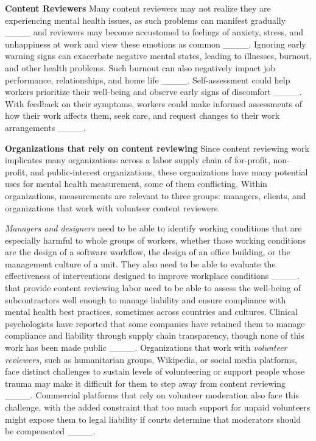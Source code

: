 \textbf{Content Reviewers}
Many content reviewers may not realize they are experiencing mental health issues, as such problems can manifest gradually ____ and reviewers may become accustomed to feelings of anxiety, stress, and unhappiness at work and view these emotions as common ____. Ignoring early warning signs can exacerbate negative mental states, leading to illnesses, burnout, and other health problems. Such burnout can also negatively impact job performance, relationships, and home life ____. Self-assessment could help workers prioritize their well-being and observe early signs of discomfort ____. With feedback on their symptoms, workers could make informed assessments of how their work affects them, seek care, and request changes to their work arrangements ____. 


\textbf{Organizations that rely on content reviewing}
Since content reviewing work implicates many organizations across a labor supply chain of for-profit, non-profit, and public-interest organizations, these organizations have many potential uses for mental health measurement, some of them conflicting. Within organizations, measurements are relevant to three groups: managers, clients, and organizations that work with volunteer content reviewers.

\textit{Managers and designers} need to be able to identify working conditions that are especially harmful to whole groups of workers, whether those working conditions are the design of a software workflow, the design of an office building, or the management culture of a unit. They also need to be able to evaluate the effectiveness of interventions designed to improve workplace conditions ____.  that provide content reviewing labor need to be able to assess the well-being of subcontractors well enough to manage liability and ensure compliance with mental health best practices, sometimes across countries and cultures. Clinical psychologists have reported that some companies have retained them to manage compliance and liability through supply chain transparency, though none of this work has been made public ____. Organizations that work with \textit{volunteer reviewers,} such as humanitarian groups, Wikipedia, or social media platforms, face distinct challenges to sustain levels of volunteering or support people whose trauma may make it difficult for them to step away from content reviewing ____. Commercial platforms that rely on volunteer moderation also face this challenge, with the added constraint that too much support for unpaid volunteers might expose them to legal liability if courts determine that moderators should be compensated ____.

